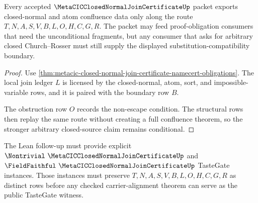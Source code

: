 \begin{theorem}
\label{thm:metacic-closed-normal-join-certificate-boundary-retention}
Every accepted $\MetaCICClosedNormalJoinCertificateUp$ packet exports closed-normal and atom confluence data only along the route $T,N,A,S,V,B,L,O,H,C,G,R$. The packet may feed proof-obligation consumers that need the unconditional fragments, but any consumer that asks for arbitrary closed Church--Rosser must still supply the displayed substitution-compatibility boundary.
\end{theorem}
\begin{proof}
Use \autoref{thm:metacic-closed-normal-join-certificate-namecert-obligations}. The local join ledger $L$ is licensed by the closed-normal, atom, sort, and impossible-variable rows, and it is paired with the boundary row $B$.

The obstruction row $O$ records the non-escape condition. The structural rows then replay the same route without creating a full confluence theorem, so the stronger arbitrary closed-source claim remains conditional.
\end{proof}



The Lean follow-up must provide explicit $\Nontrivial\ \MetaCICClosedNormalJoinCertificateUp$ and $\FieldFaithful\ \MetaCICClosedNormalJoinCertificateUp$ TasteGate instances. Those instances must preserve $T,N,A,S,V,B,L,O,H,C,G,R$ as distinct rows before any checked carrier-alignment theorem can serve as the public TasteGate witness.


